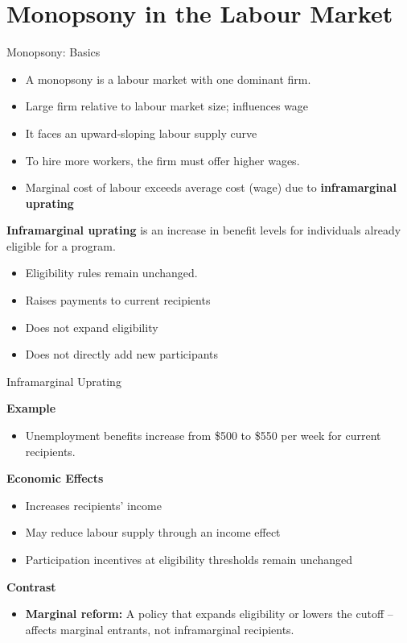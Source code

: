 \documentclass[aspectratio=169]{beamer}
\begin{document}
\section{Monopsony in the Labour Market}

\begin{frame}{Monopsony: Basics}
\transfade
\begin{itemize}[<+->]
\item  A monopsony is a labour market with one dominant firm.
  \item Large firm relative to labour market size; influences wage

\item It faces an upward-sloping labour supply curve 

\item To hire more workers, the firm must offer higher wages.
  \item Marginal cost of labour exceeds average cost (wage) due to\textbf{ inframarginal uprating}
\end{itemize}

 \textbf{Inframarginal uprating} is an increase in benefit levels for individuals already eligible for a program.
\begin{itemize}[<+->]
\item Eligibility rules remain unchanged.

\item Raises payments to current recipients
\item Does not expand eligibility
\item Does not directly add new participants
\end{itemize}
\end{frame}

 \begin{frame}{Inframarginal Uprating}




\textbf{Example}
\begin{itemize}
\item Unemployment benefits increase from \$500 to \$550 per week for current recipients.
\end{itemize}

\textbf{Economic Effects}
\begin{itemize}
\item Increases recipients’ income
\item May reduce labour supply through an income effect
\item Participation incentives at eligibility thresholds remain unchanged
\end{itemize}

\textbf{Contrast}
\begin{itemize}
\item \textbf{Marginal reform:} A policy that expands eligibility or lowers the cutoff -- affects marginal entrants, not inframarginal recipients.
\end{itemize}

\end{frame}
\end{document}
